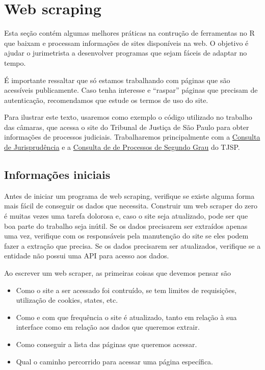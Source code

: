 \documentclass[]{book}
\providecommand{\tightlist}{%
  \setlength{\itemsep}{0pt}\setlength{\parskip}{0pt}}
\begin{document}
\section{Web scraping}\label{web-scraping}

Esta seção contém algumas melhores práticas na contrução de ferramentas
no R que baixam e processam informações de sites disponíveis na web. O
objetivo é ajudar o jurimetrista a desenvolver programas que sejam
fáceis de adaptar no tempo.

É importante ressaltar que só estamos trabalhando com páginas que são
acessíveis publicamente. Caso tenha interesse e ``raspar'' páginas que
precisam de autenticação, recomendamos que estude os termos de uso do
site.

Para ilustrar este texto, usaremos como exemplo o código utilizado no
trabalho das câmaras, que acessa o site do Tribunal de Justiça de São
Paulo para obter informações de processos judiciais. Trabalharemos
principalmente com a
\href{https://esaj.tjsp.jus.br/cjsg/consultaCompleta.do}{Consulta de
Jurisprudência} e a
\href{https://esaj.tjsp.jus.br/cpo/sg/open.do}{Consulta de de Processos
de Segundo Grau} do TJSP.

\subsection{Informações iniciais}\label{informacoes-iniciais}

Antes de iniciar um programa de web scraping, verifique se existe alguma
forma mais fácil de conseguir os dados que necessita. Construir um web
scraper do zero é muitas vezes uma tarefa dolorosa e, caso o site seja
atualizado, pode ser que boa parte do trabalho seja inútil. Se os dados
precisarem ser extraídos apenas uma vez, verifique com os responsáveis
pela manutenção do site se eles podem fazer a extração que precisa. Se
os dados precisarem ser atualizados, verifique se a entidade não possui
uma API para acesso aos dados.

Ao escrever um web scraper, as primeiras coisas que devemos pensar são

\begin{itemize}
\tightlist
\item
  Como o site a ser acessado foi contruído, se tem limites de
  requisições, utilização de cookies, states, etc.
\item
  Como e com que frequência o site é atualizado, tanto em relação à sua
  interface como em relação aos dados que queremos extrair.
\item
  Como conseguir a lista das páginas que queremos acessar.
\item
  Qual o caminho percorrido para acessar uma página específica.
\end{itemize}
\end{document}
